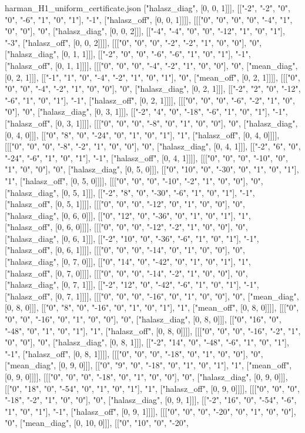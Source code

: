 \begin{filecontents*}[overwrite]{harman_H1_uniform_certificate.json}
["halasz_diag", [0, 0, 1]]], [["-2", "-2", "0", "0", "-6", "1", "0", "1"], "-1", ["halasz_off", [0, 0, 1]]]], [[["0", "0", "0", "0", "-4", "1", "0", "0"], "0", ["halasz_diag", [0, 0, 2]]], [["-4", "-4", "0", "0", "-12", "1", "0", "1"], "-3", ["halasz_off", [0, 0, 2]]]], [[["0", "0", "0", "-2", "-2", "1", "0", "0"], "0", ["halasz_diag", [0, 1, 1]]], [["-2", "0", "0", "-6", "-6", "1", "0", "1"], "-1", ["halasz_off", [0, 1, 1]]]], [[["0", "0", "0", "-4", "-2", "1", "0", "0"], "0", ["mean_diag", [0, 2, 1]]], [["-1", "1", "0", "-4", "-2", "1", "0", "1"], "0", ["mean_off", [0, 2, 1]]]], [[["0", "0", "0", "-4", "-2", "1", "0", "0"], "0", ["halasz_diag", [0, 2, 1]]], [["-2", "2", "0", "-12", "-6", "1", "0", "1"], "-1", ["halasz_off", [0, 2, 1]]]], [[["0", "0", "0", "-6", "-2", "1", "0", "0"], "0", ["halasz_diag", [0, 3, 1]]], [["-2", "4", "0", "-18", "-6", "1", "0", "1"], "-1", ["halasz_off", [0, 3, 1]]]], [[["0", "0", "0", "-8", "0", "1", "0", "0"], "0", ["halasz_diag", [0, 4, 0]]], [["0", "8", "0", "-24", "0", "1", "0", "1"], "1", ["halasz_off", [0, 4, 0]]]], [[["0", "0", "0", "-8", "-2", "1", "0", "0"], "0", ["halasz_diag", [0, 4, 1]]], [["-2", "6", "0", "-24", "-6", "1", "0", "1"], "-1", ["halasz_off", [0, 4, 1]]]], [[["0", "0", "0", "-10", "0", "1", "0", "0"], "0", ["halasz_diag", [0, 5, 0]]], [["0", "10", "0", "-30", "0", "1", "0", "1"], "1", ["halasz_off", [0, 5, 0]]]], [[["0", "0", "0", "-10", "-2", "1", "0", "0"], "0", ["halasz_diag", [0, 5, 1]]], [["-2", "8", "0", "-30", "-6", "1", "0", "1"], "-1", ["halasz_off", [0, 5, 1]]]], [[["0", "0", "0", "-12", "0", "1", "0", "0"], "0", ["halasz_diag", [0, 6, 0]]], [["0", "12", "0", "-36", "0", "1", "0", "1"], "1", ["halasz_off", [0, 6, 0]]]], [[["0", "0", "0", "-12", "-2", "1", "0", "0"], "0", ["halasz_diag", [0, 6, 1]]], [["-2", "10", "0", "-36", "-6", "1", "0", "1"], "-1", ["halasz_off", [0, 6, 1]]]], [[["0", "0", "0", "-14", "0", "1", "0", "0"], "0", ["halasz_diag", [0, 7, 0]]], [["0", "14", "0", "-42", "0", "1", "0", "1"], "1", ["halasz_off", [0, 7, 0]]]], [[["0", "0", "0", "-14", "-2", "1", "0", "0"], "0", ["halasz_diag", [0, 7, 1]]], [["-2", "12", "0", "-42", "-6", "1", "0", "1"], "-1", ["halasz_off", [0, 7, 1]]]], [[["0", "0", "0", "-16", "0", "1", "0", "0"], "0", ["mean_diag", [0, 8, 0]]], [["0", "8", "0", "-16", "0", "1", "0", "1"], "1", ["mean_off", [0, 8, 0]]]], [[["0", "0", "0", "-16", "0", "1", "0", "0"], "0", ["halasz_diag", [0, 8, 0]]], [["0", "16", "0", "-48", "0", "1", "0", "1"], "1", ["halasz_off", [0, 8, 0]]]], [[["0", "0", "0", "-16", "-2", "1", "0", "0"], "0", ["halasz_diag", [0, 8, 1]]], [["-2", "14", "0", "-48", "-6", "1", "0", "1"], "-1", ["halasz_off", [0, 8, 1]]]], [[["0", "0", "0", "-18", "0", "1", "0", "0"], "0", ["mean_diag", [0, 9, 0]]], [["0", "9", "0", "-18", "0", "1", "0", "1"], "1", ["mean_off", [0, 9, 0]]]], [[["0", "0", "0", "-18", "0", "1", "0", "0"], "0", ["halasz_diag", [0, 9, 0]]], [["0", "18", "0", "-54", "0", "1", "0", "1"], "1", ["halasz_off", [0, 9, 0]]]], [[["0", "0", "0", "-18", "-2", "1", "0", "0"], "0", ["halasz_diag", [0, 9, 1]]], [["-2", "16", "0", "-54", "-6", "1", "0", "1"], "-1", ["halasz_off", [0, 9, 1]]]], [[["0", "0", "0", "-20", "0", "1", "0", "0"], "0", ["mean_diag", [0, 10, 0]]], [["0", "10", "0", "-20", 
\end{filecontents*}
